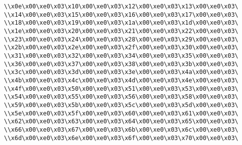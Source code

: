 \verb|\\x0e\x00\xe0\x03\x10\x00\xe0\x03\x12\x00\xe0\x03\x13\x00\xe0\x03\|\newline
\verb|\\x14\x00\xe0\x03\x15\x00\xe0\x03\x16\x00\xe0\x03\x17\x00\xe0\x03\|\newline
\verb|\\x18\x00\xe0\x03\x19\x00\xe0\x03\x1a\x00\xe0\x03\x1d\x00\xe0\x03\|\newline
\verb|\\x1e\x00\xe0\x03\x20\x00\xe0\x03\x21\x00\xe0\x03\x22\x00\xe0\x03\|\newline
\verb|\\x23\x00\xe0\x03\x24\x00\xe0\x03\x28\x00\xe0\x03\x29\x00\xe0\x03\|\newline
\verb|\\x2b\x00\xe0\x03\x2e\x00\xe0\x03\x2f\x00\xe0\x03\x30\x00\xe0\x03\|\newline
\verb|\\x31\x00\xe0\x03\x32\x00\xe0\x03\x34\x00\xe0\x03\x35\x00\xe0\x03\|\newline
\verb|\\x36\x00\xe0\x03\x37\x00\xe0\x03\x38\x00\xe0\x03\x3b\x00\xe0\x03\|\newline
\verb|\\x3c\x00\xe0\x03\x3d\x00\xe0\x03\x3e\x00\xe0\x03\x4a\x00\xe0\x03\|\newline
\verb|\\x4b\x00\xe0\x03\x4c\x00\xe0\x03\x4d\x00\xe0\x03\x4e\x00\xe0\x03\|\newline
\verb|\\x4f\x00\xe0\x03\x50\x00\xe0\x03\x51\x00\xe0\x03\x53\x00\xe0\x03\|\newline
\verb|\\x54\x00\xe0\x03\x55\x00\xe0\x03\x56\x00\xe0\x03\x58\x00\xe0\x03\|\newline
\verb|\\x59\x00\xe0\x03\x5b\x00\xe0\x03\x5c\x00\xe0\x03\x5d\x00\xe0\x03\|\newline
\verb|\\x5e\x00\xe0\x03\x5f\x00\xe0\x03\x60\x00\xe0\x03\x61\x00\xe0\x03\|\newline
\verb|\\x62\x00\xe0\x03\x63\x00\xe0\x03\x64\x00\xe0\x03\x65\x00\xe0\x03\|\newline
\verb|\\x66\x00\xe0\x03\x67\x00\xe0\x03\x6b\x00\xe0\x03\x6c\x00\xe0\x03\|\newline
\verb|\\x6d\x00\xe0\x03\x6e\x00\xe0\x03\x6f\x00\xe0\x03\x70\x00\xe0\x03\|\newline
